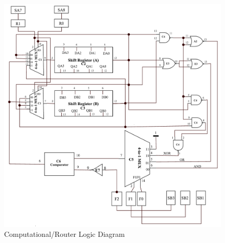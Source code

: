 \documentclass[journal, twocolumn, final,11pt,letterpaper]{IEEEtran}
\begin{document}
\begin{figure} [H]
 	\centering
 	\includegraphics[scale=0.55]{Computational_Router_Logic.png}
 	\caption{Computational/Router Logic Diagram\label{fig:computational-router-logic-diagram}}
\end{figure}


\end{document}
